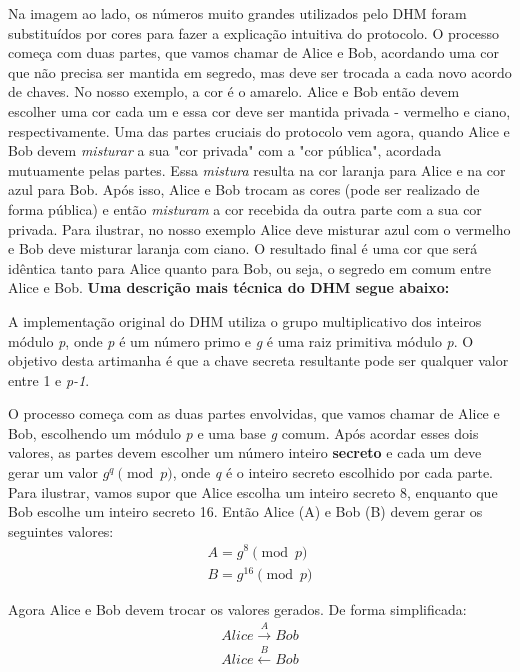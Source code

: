 \documentclass[a4paper,11pt]{article}
\theoremstyle{mytheor}
\begin{document}
\noindent Na imagem ao lado, os números muito grandes utilizados pelo DHM foram substituídos por cores para fazer a explicação intuitiva do protocolo. O processo começa com duas partes, que vamos chamar de Alice e Bob, acordando uma cor que não precisa ser mantida em segredo, mas deve ser trocada a cada novo acordo de chaves. No nosso exemplo, a cor é o amarelo. Alice e Bob então devem escolher uma cor cada um e essa cor deve ser mantida privada - vermelho e ciano, respectivamente. Uma das partes cruciais do protocolo vem agora, quando Alice e Bob devem \textit{misturar} a sua "cor privada" com a "cor pública", acordada mutuamente pelas partes. Essa \textit{mistura} resulta na cor laranja para Alice e na cor azul para Bob. Após isso, Alice e Bob trocam as cores (pode ser realizado de forma pública) e então \textit{misturam} a cor recebida da outra parte com a sua cor privada. Para ilustrar, no nosso exemplo Alice deve misturar azul com o vermelho e Bob deve misturar laranja com ciano. O resultado final é uma cor que será idêntica tanto para Alice quanto para Bob, ou seja, o segredo em comum entre Alice e Bob.
\newline\newline
\noindent \textbf{Uma descrição mais técnica do DHM segue abaixo:}

\noindent A implementação original do DHM utiliza o grupo multiplicativo dos inteiros módulo \textit{p}, onde \textit{p} é um número primo e \textit{g} é uma raiz primitiva módulo \textit{p}. O objetivo desta artimanha é que a chave secreta resultante pode ser qualquer valor entre 1 e \textit{p-1}. 

O processo começa com as duas partes envolvidas, que vamos chamar de Alice e Bob, escolhendo um módulo \textit{p} e uma base \textit{g} comum. Após acordar esses dois valores, as partes devem escolher um número inteiro \textbf{secreto} e cada um deve gerar um valor $g^{q} \pmod{p}$, onde \textit{q} é o inteiro secreto escolhido por cada parte. Para ilustrar, vamos supor que Alice escolha um inteiro secreto 8, enquanto que Bob escolhe um inteiro secreto 16. Então Alice (A) e Bob (B) devem gerar os seguintes valores:
\begin{align*}
A = g^{8} \pmod{p} \\
B = g^{16} \pmod{p}
\end{align*}

\noindent Agora Alice e Bob devem trocar os valores gerados. De forma simplificada:
\begin{align*}
Alice \overset{A}{\longrightarrow} Bob \\
Alice \overset{B}{\longleftarrow} Bob
\end{align*}
\end{document}
